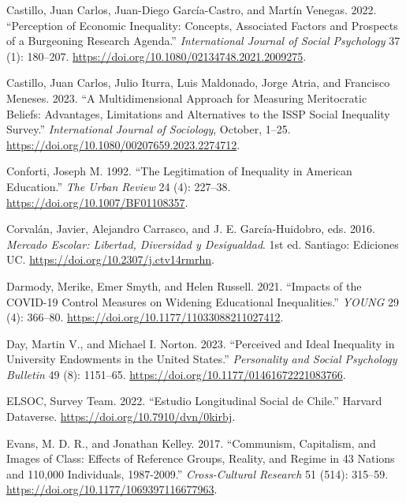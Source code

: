 \documentclass[
]{article}
\newlength{\cslhangindent}
\newenvironment{CSLReferences}[2] %
 {\begin{list}{}{%
  \setlength{\itemindent}{0pt}
  \setlength{\leftmargin}{0pt}
  \setlength{\parsep}{0pt}
  \ifodd #1
   \setlength{\leftmargin}{\cslhangindent}
   \setlength{\itemindent}{-1\cslhangindent}
  \fi
  \setlength{\itemsep}{#2\baselineskip}}}
 {\end{list}}
\begin{document}
\begin{CSLReferences}{1}{0}
Castillo, Juan Carlos, Juan-Diego García-Castro, and Martín Venegas.
2022. {``Perception of Economic Inequality: Concepts, Associated Factors
and Prospects of a Burgeoning Research Agenda.''} \emph{International
Journal of Social Psychology} 37 (1): 180--207.
\url{https://doi.org/10.1080/02134748.2021.2009275}.

Castillo, Juan Carlos, Julio Iturra, Luis Maldonado, Jorge Atria, and
Francisco Meneses. 2023. {``A {Multidimensional Approach} for {Measuring
Meritocratic Beliefs}: {Advantages}, {Limitations} and {Alternatives} to
the {ISSP Social Inequality Survey}.''} \emph{International Journal of
Sociology}, October, 1--25.
\url{https://doi.org/10.1080/00207659.2023.2274712}.

Conforti, Joseph M. 1992. {``The Legitimation of Inequality in
{American} Education.''} \emph{The Urban Review} 24 (4): 227--38.
\url{https://doi.org/10.1007/BF01108357}.

Corvalán, Javier, Alejandro Carrasco, and J. E. García-Huidobro, eds.
2016. \emph{Mercado Escolar: {Libertad}, Diversidad y Desigualdad}. 1st
ed. Santiago: Ediciones UC. \url{https://doi.org/10.2307/j.ctv14rmrhn}.

Darmody, Merike, Emer Smyth, and Helen Russell. 2021. {``Impacts of the
{COVID-19 Control Measures} on {Widening Educational Inequalities}.''}
\emph{YOUNG} 29 (4): 366--80.
\url{https://doi.org/10.1177/11033088211027412}.

Day, Martin V., and Michael I. Norton. 2023. {``Perceived and {Ideal
Inequality} in {University Endowments} in the {United States}.''}
\emph{Personality and Social Psychology Bulletin} 49 (8): 1151--65.
\url{https://doi.org/10.1177/01461672221083766}.

ELSOC, Survey Team. 2022. {``Estudio {Longitudinal Social} de
{Chile}.''} Harvard Dataverse. \url{https://doi.org/10.7910/dvn/0kirbj}.

Evans, M. D. R., and Jonathan Kelley. 2017. {``Communism, {Capitalism},
and {Images} of {Class}: {Effects} of {Reference Groups}, {Reality}, and
{Regime} in 43 {Nations} and 110,000 {Individuals}, 1987-2009.''}
\emph{Cross-Cultural Research} 51 (514): 315--59.
\url{https://doi.org/10.1177/1069397116677963}.


\end{CSLReferences}
\end{document}
